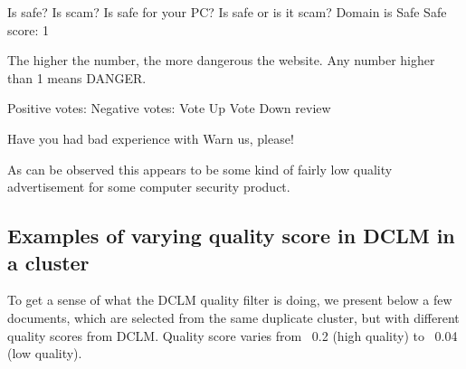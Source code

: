 \documentclass[conference]{IEEEtran}
\begin{document}
\begin{textbox}
Is safe? Is scam?
Is safe for your PC?
Is safe or is it scam?
Domain is Safe
Safe score: 1

The higher the number, the more dangerous the website.
Any number higher than 1 means DANGER.

Positive votes:
Negative votes:
Vote Up Vote Down review

Have you had bad experience with Warn us, please!
\end{textbox}

As can be observed this appears to be some kind of fairly low quality advertisement for some computer security product. 

\subsection{Examples of varying quality score in DCLM in a cluster}

To get a sense of what the DCLM quality filter is doing, we present below a few documents, which are selected from the same duplicate cluster, but with different quality scores from DCLM. Quality score varies from ~0.2 (high quality) to ~0.04 (low quality).
\end{document}

